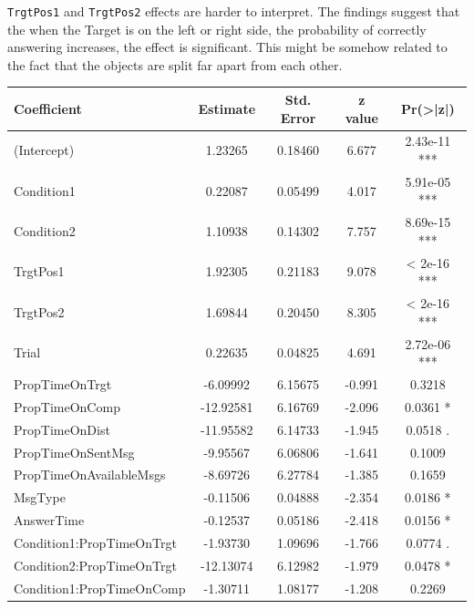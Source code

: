 \texttt{TrgtPos1} and \texttt{TrgtPos2} effects are harder to interpret. The findings suggest that the when the Target is on the left or right side, the probability of correctly answering increases, the effect is significant. This might be somehow related to the fact that the objects are split far apart from each other.

\begin{table}[h!]
\centering
\begin{tabular}{|l|c|c|c|c|}
\hline
\textbf{Coefficient} & \textbf{Estimate} & \textbf{Std. Error} & \textbf{z value} & \textbf{Pr(>|z|)} \\ \hline
(Intercept)                          & 1.23265 & 0.18460 & 6.677 & 2.43e-11 *** \\ \hline
Condition1                           & 0.22087 & 0.05499 & 4.017 & 5.91e-05 *** \\ \hline
Condition2                           & 1.10938 & 0.14302 & 7.757 & 8.69e-15 *** \\ \hline
TrgtPos1                             & 1.92305 & 0.21183 & 9.078 & < 2e-16 *** \\ \hline
TrgtPos2                             & 1.69844 & 0.20450 & 8.305 & < 2e-16 *** \\ \hline
Trial                                & 0.22635 & 0.04825 & 4.691 & 2.72e-06 *** \\ \hline
PropTimeOnTrgt                      & -6.09992 & 6.15675 & -0.991 & 0.3218 \\ \hline
PropTimeOnComp                     & -12.92581 & 6.16769 & -2.096 & 0.0361 * \\ \hline
PropTimeOnDist                     & -11.95582 & 6.14733 & -1.945 & 0.0518 . \\ \hline
PropTimeOnSentMsg                   & -9.95567 & 6.06806 & -1.641 & 0.1009 \\ \hline
PropTimeOnAvailableMsgs             & -8.69726 & 6.27784 & -1.385 & 0.1659 \\ \hline
MsgType                            & -0.11506 & 0.04888 & -2.354 & 0.0186 * \\ \hline
AnswerTime                          & -0.12537 & 0.05186 & -2.418 & 0.0156 * \\ \hline
Condition1:PropTimeOnTrgt           & -1.93730 & 1.09696 & -1.766 & 0.0774 . \\ \hline
Condition2:PropTimeOnTrgt          & -12.13074 & 6.12982 & -1.979 & 0.0478 * \\ \hline
Condition1:PropTimeOnComp           & -1.30711 & 1.08177 & -1.208 & 0.2269 \\ \hline

\end{tabular}
\end{table}
